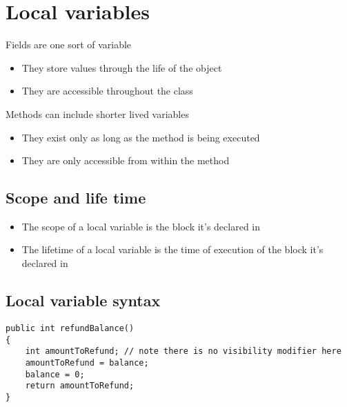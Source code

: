 \documentclass{article}[18pt]
\begin{document}
\section{Local variables}
Fields are one sort of variable
\begin{itemize}
	\item They store values through the life of the object
	\item They are accessible throughout the class
\end{itemize}
Methods can include shorter lived variables
\begin{itemize}
	\item They exist only as long as the method is being executed
	\item They are only accessible from within the method
\end{itemize}
\subsection{Scope and life time}
\begin{itemize}
	\item The scope of a local variable is the block it's declared in
	\item The lifetime of a local variable is the time of execution of the block it's declared in
\end{itemize}
\subsection{Local variable syntax}
\begin{verbatim}
public int refundBalance()
{
	int amountToRefund; // note there is no visibility modifier here
	amountToRefund = balance;
	balance = 0;
	return amountToRefund;
}
\end{verbatim}
\end{document}
